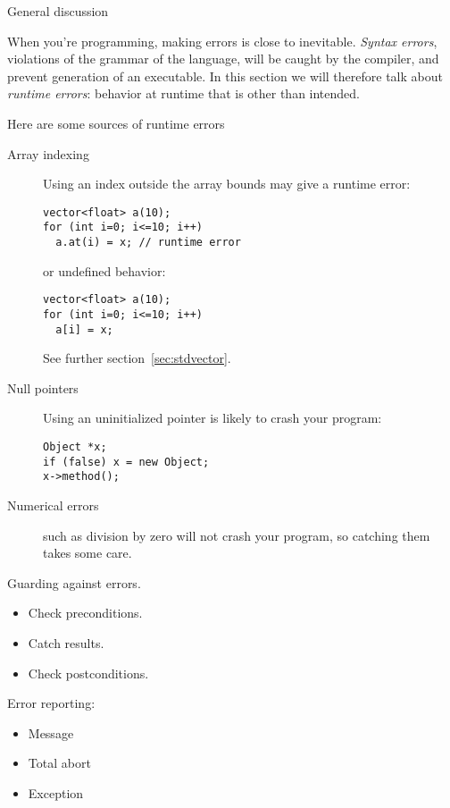 
 {General discussion}

When you're programming, making errors is close to inevitable.
%
\emph{Syntax errors}, violations of the grammar of
the language, will be caught by the compiler, and prevent generation
of an executable. In this section we will therefore talk about
%
\emph{runtime errors}: behavior at runtime that
is other than intended.

Here are some sources of runtime errors
\begin{description}
\item[Array indexing] Using an index outside the array bounds may give
  a runtime error:
\begin{lstlisting}
vector<float> a(10);
for (int i=0; i<=10; i++)
  a.at(i) = x; // runtime error
\end{lstlisting}
or undefined behavior:
\begin{lstlisting}
vector<float> a(10);
for (int i=0; i<=10; i++)
  a[i] = x;
\end{lstlisting}
See further section~\ref{sec:stdvector}.
\item[Null pointers] Using an uninitialized pointer is likely to crash
  your program:
\begin{lstlisting}
Object *x;
if (false) x = new Object;
x->method();
\end{lstlisting}
\item[Numerical errors] such as division by zero will not crash your
  program, so catching them takes some care.
\end{description}

Guarding against errors.
\begin{itemize}
\item Check preconditions.
\item Catch results.
\item Check postconditions.
\end{itemize}

Error reporting:
\begin{itemize}
\item Message
\item Total abort
\item Exception
\end{itemize}

